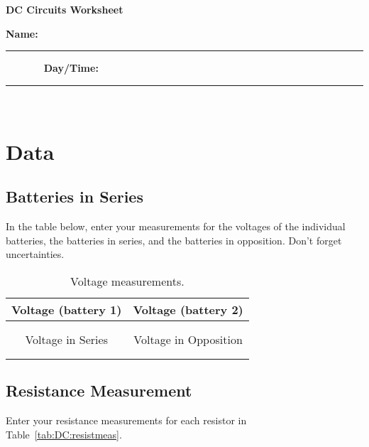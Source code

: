 \pagestyle{empty}


\thispagestyle{empty}

\begin{center}
{\bf\Large DC Circuits Worksheet}
\end{center}

{\bf \Large Name:}~ \rule{5cm}{.1mm}~~~~~~~
{\bf \Large Day/Time:}~\rule{3cm}{.1mm}\\

\section {Data}
\subsection {Batteries in Series}
In the table below, enter your measurements for the voltages of the
individual batteries, the batteries in series, and the batteries in opposition. Don't
forget uncertainties.

\begin{table}[h]
\begin{center}
\begin{tabular}{|c|c|}
\hline
Voltage (battery 1) & Voltage (battery 2) \\ 
\hline
\hspace*{5cm} & \hspace*{5cm}\\
& \\
\hline
\hline
Voltage in Series & Voltage in Opposition \\
\hline
& \\
& \\
\hline
\end{tabular}
\end{center}
\caption{Voltage measurements.}
\label{tab:DC:battseries}
\end{table}


\newpage
\subsection{Resistance Measurement}

\noindent
Enter your resistance measurements for each resistor in 
Table~\ref{tab:DC:resistmeas}. 

